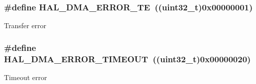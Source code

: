 \subsubsection[{\texorpdfstring{H\+A\+L\+\_\+\+D\+M\+A\+\_\+\+E\+R\+R\+O\+R\+\_\+\+TE}{HAL_DMA_ERROR_TE}}]{\setlength{\rightskip}{0pt plus 5cm}\#define H\+A\+L\+\_\+\+D\+M\+A\+\_\+\+E\+R\+R\+O\+R\+\_\+\+TE~((uint32\+\_\+t)0x00000001)}\hypertarget{group___d_m_a___error___code_ga9882442c5f8f0170917934bbee1cc92d}{}\label{group___d_m_a___error___code_ga9882442c5f8f0170917934bbee1cc92d}
Transfer error 
\subsubsection[{\texorpdfstring{H\+A\+L\+\_\+\+D\+M\+A\+\_\+\+E\+R\+R\+O\+R\+\_\+\+T\+I\+M\+E\+O\+UT}{HAL_DMA_ERROR_TIMEOUT}}]{\setlength{\rightskip}{0pt plus 5cm}\#define H\+A\+L\+\_\+\+D\+M\+A\+\_\+\+E\+R\+R\+O\+R\+\_\+\+T\+I\+M\+E\+O\+UT~((uint32\+\_\+t)0x00000020)}\hypertarget{group___d_m_a___error___code_ga6cf6a5b8881ff36ed4316a29bbfb5b79}{}\label{group___d_m_a___error___code_ga6cf6a5b8881ff36ed4316a29bbfb5b79}
Timeout error 